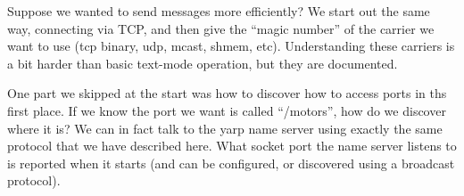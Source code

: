 Suppose we wanted to send messages more efficiently?  We start out the
same way, connecting via TCP, and then give the ``magic number'' of
the carrier we want to use (tcp binary, udp, mcast, shmem, etc).
Understanding these carriers is a bit harder than basic text-mode operation,
but they are documented.

One part we skipped at the start was how to discover how to 
access ports in ths first place.  If we know the port we want
is called ``/motors'', how do we discover where it is?  We can
in fact talk to the yarp name server using exactly the same 
protocol that we have described here.  What socket port
the name server listens to is reported when it starts
(and can be configured, or discovered using a broadcast
protocol).





%

